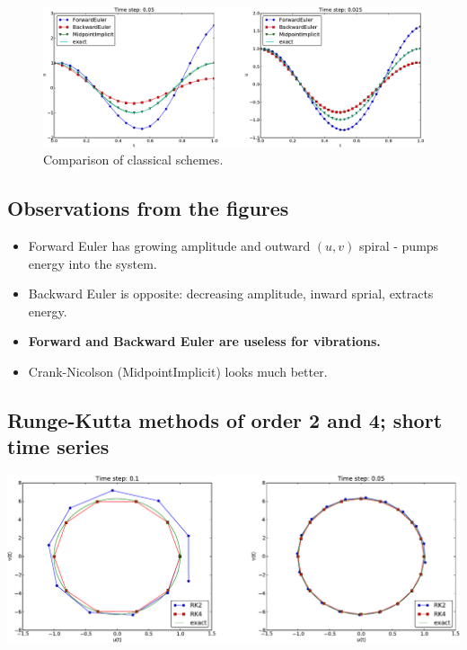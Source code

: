 \documentclass[%
oneside,                 %
final,                   %
10pt]{article}
\begin{document}
\begin{figure}[!ht]  %
  \centerline{\includegraphics[width=1.0\linewidth]{fig-vib/vib_theta_1_u.pdf}}
  \caption{
  Comparison of classical schemes. \label{vib:model1:1st:odespy:theta}
  }
\end{figure}


\subsection*{Observations from the figures}

\begin{itemize}
  \item Forward Euler has growing amplitude and outward $(u,v)$ spiral - pumps
    energy into the system.

  \item Backward Euler is opposite: decreasing amplitude, inward sprial,
    extracts energy.

  \item \textbf{Forward and Backward Euler are useless for vibrations.}

  \item Crank-Nicolson (MidpointImplicit) looks much better.
\end{itemize}

\noindent
\subsection*{Runge-Kutta methods of order 2 and 4; short time series}



\centerline{\includegraphics[width=1.0\linewidth]{fig-vib/vib_RK_1_pp.pdf}}
\end{document}
